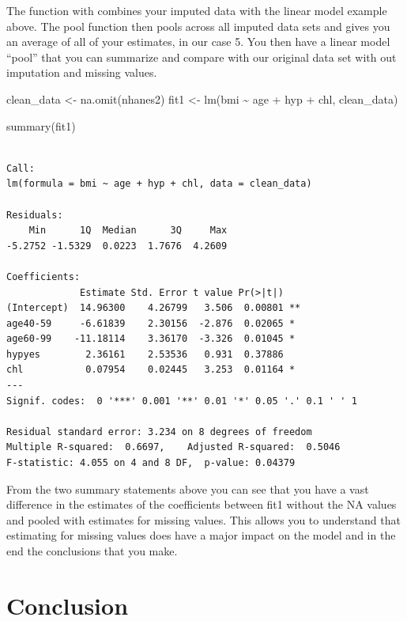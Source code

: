\documentclass[
  letterpaper,
  DIV=11,
  numbers=noendperiod]{scrreprt}
\newenvironment{Shaded}{\begin{snugshade}}{\end{snugshade}}
\newcommand{\FunctionTok}[1]{\textcolor[rgb]{0.28,0.35,0.67}{#1}}
\newcommand{\NormalTok}[1]{\textcolor[rgb]{0.00,0.23,0.31}{#1}}
\newcommand{\OtherTok}[1]{\textcolor[rgb]{0.00,0.23,0.31}{#1}}
\newcommand{\SpecialCharTok}[1]{\textcolor[rgb]{0.37,0.37,0.37}{#1}}
\begin{document}
The function with combines your imputed data with the linear model
example above. The pool function then pools across all imputed data sets
and gives you an average of all of your estimates, in our case 5. You
then have a linear model ``pool'' that you can summarize and compare
with our original data set with out imputation and missing values.

\begin{Shaded}
\begin{Highlighting}[]
\NormalTok{clean\_data }\OtherTok{\textless{}{-}} \FunctionTok{na.omit}\NormalTok{(nhanes2)}
\NormalTok{fit1 }\OtherTok{\textless{}{-}} \FunctionTok{lm}\NormalTok{(bmi }\SpecialCharTok{\textasciitilde{}}\NormalTok{ age }\SpecialCharTok{+}\NormalTok{ hyp }\SpecialCharTok{+}\NormalTok{ chl, clean\_data)}

\FunctionTok{summary}\NormalTok{(fit1)}
\end{Highlighting}
\end{Shaded}

\begin{verbatim}

Call:
lm(formula = bmi ~ age + hyp + chl, data = clean_data)

Residuals:
    Min      1Q  Median      3Q     Max 
-5.2752 -1.5329  0.0223  1.7676  4.2609 

Coefficients:
             Estimate Std. Error t value Pr(>|t|)   
(Intercept)  14.96300    4.26799   3.506  0.00801 **
age40-59     -6.61839    2.30156  -2.876  0.02065 * 
age60-99    -11.18114    3.36170  -3.326  0.01045 * 
hypyes        2.36161    2.53536   0.931  0.37886   
chl           0.07954    0.02445   3.253  0.01164 * 
---
Signif. codes:  0 '***' 0.001 '**' 0.01 '*' 0.05 '.' 0.1 ' ' 1

Residual standard error: 3.234 on 8 degrees of freedom
Multiple R-squared:  0.6697,    Adjusted R-squared:  0.5046 
F-statistic: 4.055 on 4 and 8 DF,  p-value: 0.04379
\end{verbatim}

From the two summary statements above you can see that you have a vast
difference in the estimates of the coefficients between fit1 without the
NA values and pooled with estimates for missing values. This allows you
to understand that estimating for missing values does have a major
impact on the model and in the end the conclusions that you make.

\section{Conclusion}\label{conclusion}
\end{document}
